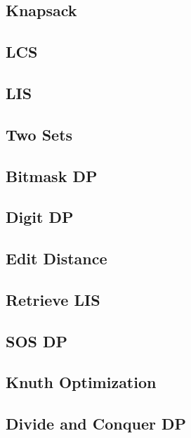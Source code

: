 \documentclass[10pt,letterpaper,landscape,twocolumn]{article}
\begin{document}
\subsection{Knapsack}

\subsection{LCS}

\subsection{LIS}

\subsection{Two Sets}

\subsection{Bitmask DP}

\subsection{Digit DP}

\subsection{Edit Distance}

\subsection{Retrieve LIS}

\subsection{SOS DP}

\subsection{Knuth Optimization}

\subsection{Divide and Conquer DP}


\end{document}
